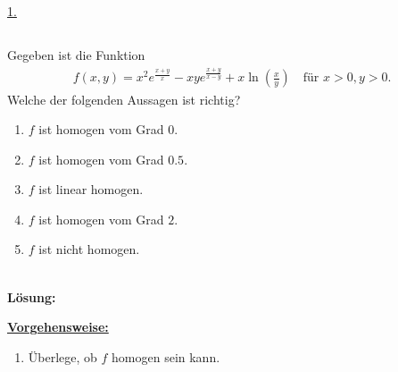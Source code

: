 \underline{1.}\\




\newpage



\subsection*{}
Gegeben ist die Funktion
\begin{align*}
	f(x,y) 
	=
	x^2 e^{\frac{x+y}{x}}
	-
	xy e^{\frac{x+y}{x-y}}
	+
	x \ln \left( \frac{x}{y} \right)
	\quad \textrm{für } x>0,y>0.
\end{align*}
Welche der folgenden Aussagen ist richtig?
\renewcommand{\labelenumi}{(\alph{enumi})}
\begin{enumerate}
	\item
	$ f  $ ist homogen vom Grad $ 0 $.
	\item
	$ f  $ ist homogen vom Grad $ 0.5 $.
	\item
	$ f $ ist linear homogen.	
	\item 
	$ f  $ ist homogen vom Grad $ 2 $.
	\item
	$ f $ ist nicht homogen.
\end{enumerate}
\ \\
\textbf{Lösung:}
\begin{mdframed}
\underline{\textbf{Vorgehensweise:}}
\renewcommand{\labelenumi}{\theenumi.}
\begin{enumerate}
\item Überlege, ob $ f $ homogen sein kann.
\end{enumerate}
\end{mdframed}


